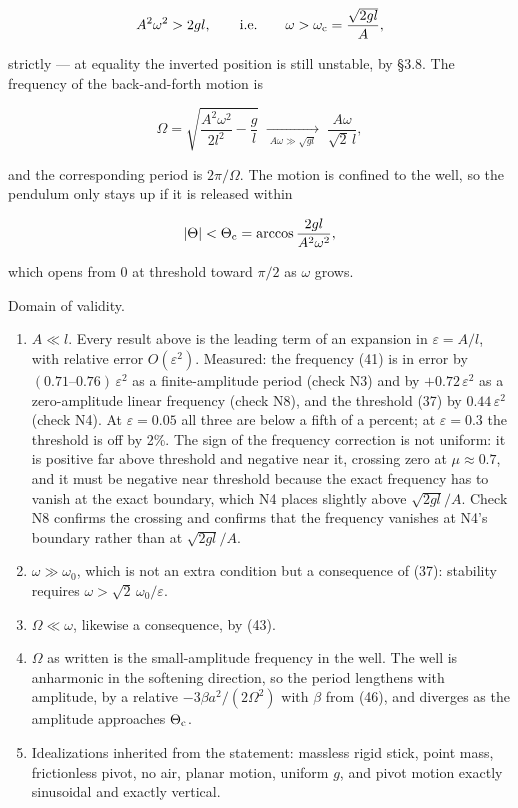 \documentclass[11pt,a4paper]{article}
\providecommand{\tightlist}{\setlength{\itemsep}{0pt}\setlength{\parskip}{0pt}}
\begin{document}
\[
A^2\omega^2 > 2gl,\qquad\text{i.e.}\qquad
  \omega > \omega_{\rm c} = \frac{\sqrt{2gl}}{A},
\]

strictly --- at equality the inverted position is still unstable, by §3.8. The
frequency of the back-and-forth motion is

\[
\Omega = \sqrt{\frac{A^2\omega^2}{2l^2}-\frac{g}{l}}
        \;\xrightarrow[\;A\omega\gg\sqrt{gl}\;]{}\;
          \frac{A\omega}{\sqrt2\,l},
\]

and the corresponding period is \(2\pi/\Omega\). The motion is confined to the
well, so the pendulum only stays up if it is released within

\[
|\Theta| < \Theta_{\rm c} = \arccos\frac{2gl}{A^2\omega^2},
\]

which opens from \(0\) at threshold toward \(\pi/2\) as \(\omega\) grows.

Domain of validity.

\begin{enumerate}
\def\labelenumi{\arabic{enumi}.}
\tightlist
\item
  \(A\ll l\). Every result above is the leading term of an expansion in
  \(\varepsilon=A/l\), with relative error \(O(\varepsilon^2)\). Measured: the
  frequency (41) is in error by \((0.71\text{–}0.76)\,\varepsilon^2\) as a
  finite-amplitude period (check N3) and by \(+0.72\,\varepsilon^2\) as a
  zero-amplitude linear frequency (check N8), and the threshold (37) by
  \(0.44\,\varepsilon^2\) (check N4). At \(\varepsilon=0.05\) all three are below a
  fifth of a percent; at \(\varepsilon=0.3\) the threshold is off by 2\%.
  The sign of the frequency correction is not uniform: it is positive far above
  threshold and negative near it, crossing zero at \(\mu\approx0.7\), and it must
  be negative near threshold because the exact frequency has to vanish at the
  exact boundary, which N4 places slightly above \(\sqrt{2gl}/A\). Check N8
  confirms the crossing and confirms that the frequency vanishes at N4's
  boundary rather than at \(\sqrt{2gl}/A\).
\item
  \(\omega\gg\omega_0\), which is not an extra condition but a consequence of
  (37): stability requires \(\omega>\sqrt2\,\omega_0/\varepsilon\).
\item
  \(\Omega\ll\omega\), likewise a consequence, by (43).
\item
  \(\Omega\) as written is the small-amplitude frequency in the well. The well
  is anharmonic in the softening direction, so the period lengthens with
  amplitude, by a relative \(-3\beta a^2/(2\Omega^2)\) with \(\beta\) from (46),
  and diverges as the amplitude approaches \(\Theta_{\rm c}\).
\item
  Idealizations inherited from the statement: massless rigid stick, point mass,
  frictionless pivot, no air, planar motion, uniform \(g\), and pivot motion
  exactly sinusoidal and exactly vertical.
\end{enumerate}
\end{document}
